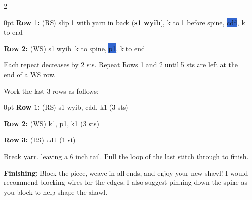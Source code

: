 \documentclass[12pt]{article}
\newcommand{\rowDir}[1]{\hspace{-2em} \textbf{#1:}} %
\newcommand{\spine}[1]{\colorbox{highlight}{#1}} %
\newenvironment{frnote}
    {%
    	\setlength{\FrameRule}{1.5pt}
    	\def\FrameCommand{\fboxrule=\FrameRule\fboxsep=\FrameSep \fcolorbox{framecolor}{shadecolor}}
    	\MakeFramed {\FrameRestore}}
    {\setlength{\FrameRule}{1pt}
	\endMakeFramed}
\newenvironment{unframed}
    {%
	\begin{addmargin}[1cm]{0pt}}
    {	\end{addmargin}}
\begin{document}
\begin{multicols}{2}
\begin{unframed}
\rowDir{Row 1} (RS) slip 1 with yarn in back (\textbf{s1 wyib}), k to 1 before spine, \spine{cdd}, k to end

\rowDir{Row 2} (WS) s1 wyib, k to spine, \spine{p1}, k to end
\end{unframed}

Each repeat decreases by 2 sts. Repeat Rows 1 and 2 until 5 sts are left at the end of a WS row. 

Work the last 3 rows as follows:

\begin{unframed}
\rowDir{Row 1} (RS) s1 wyib, cdd, k1 (3 sts)

\rowDir{Row 2} (WS) k1, p1, k1 (3 sts)

\rowDir{Row 3} (RS) cdd (1 st)
\end{unframed}

Break yarn, leaving a 6 inch tail. Pull the loop of the last stitch through to finish. 

\begin{frnote}
\textbf{Finishing:} Block the piece, weave in all ends, and enjoy your new shawl! I would recommend blocking wires for the edges. I also suggest pinning down the spine as you block to help shape the shawl.
\end{frnote}
\end{multicols}
\end{document}
